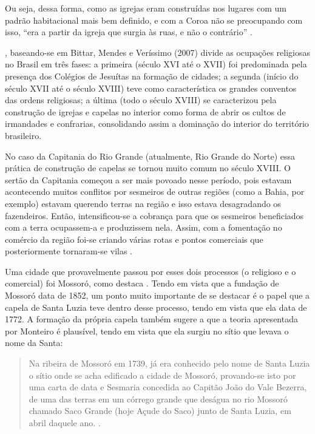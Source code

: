\begin{refsection}
    Ou seja, dessa forma, como as igrejas eram construídas nos lugares com um padrão habitacional mais bem definido, e com a Coroa não se preocupando com isso, ``era a partir da igreja que surgia às ruas, e não o contrário'' \cite[p.~195]{Parente1998Papel}.

    \textcite{Medeiros2010Igreja}, baseando-se em Bittar, Mendes e Veríssimo (2007) divide as ocupações religiosas no Brasil em três fases: a primeira (século XVI até o XVII) foi predominada pela presença dos Colégios de Jesuítas na formação de cidades; a segunda (início do século XVII até o século XVIII) teve como característica os grandes conventos das ordens religiosas; a última (todo o século XVIII) se caracterizou pela construção de igrejas e capelas no interior como forma de abrir os cultos de irmandades e confrarias, consolidando assim a dominação do interior do território brasileiro.

    No caso da Capitania do Rio Grande (atualmente, Rio Grande do Norte) essa prática de construção de capelas se tornou muito comum no século XVIII. O sertão da Capitania começou a ser mais povoado nesse período, pois estavam acontecendo muitos conflitos por sesmeiros de outras regiões (como a Bahia, por exemplo) estavam querendo terras na região e isso estava desagradando os fazendeiros. Então, intensificou-se a cobrança para que os sesmeiros beneficiados com a terra ocupassem-a e produzissem nela. Assim, com a fomentação no comércio da região foi-se criando várias rotas e pontos comerciais que posteriormente tornaram-se vilas \cite{Monteiro2000Caminhos}.

    Uma cidade que provavelmente passou por esses dois processos (o religioso e o comercial) foi Mossoró, como destaca \textcite[p.~83]{Monteiro2000Caminhos}. Tendo em vista que a fundação de Mossoró data de 1852, um ponto muito importante de se destacar é o papel que a capela de Santa Luzia teve dentro desse processo, tendo em vista que ela data de 1772. A formação da própria capela também sugere a que a teoria apresentada por Monteiro é plausível, tendo em vista que ela surgiu no sítio que levava o nome da Santa:

    \begin{quotation}
        Na ribeira de Mossoró em 1739, já era conhecido pelo nome de Santa Luzia o sítio onde se acha edificado a cidade de Mossoró, provando-se isto por uma carta de data e Sesmaria concedida ao Capitão João do Vale Bezerra, de uma das terras em um córrego grande que deságua no rio Mossoró chamado Saco Grande (hoje Açude do Saco) junto de Santa Luzia, em abril daquele ano. \cite[p.~52]{Souza2010Historia}.
    \end{quotation}


\end{refsection}

